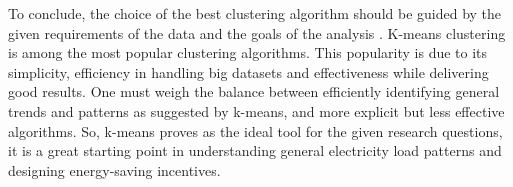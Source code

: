 To conclude, the choice of the best clustering algorithm should be guided by the given requirements of the data and the goals of the analysis \cite{COL-ALT}.
K-means clustering is among the most popular clustering algorithms.
This popularity is due to its simplicity, efficiency in handling big datasets and effectiveness while delivering good results.
One must weigh the balance between efficiently identifying general trends and patterns as suggested by k-means, and more explicit but less effective algorithms.
So, k-means proves as the ideal tool for the given research questions, it is a great starting point in understanding general electricity load patterns and designing energy-saving incentives.

